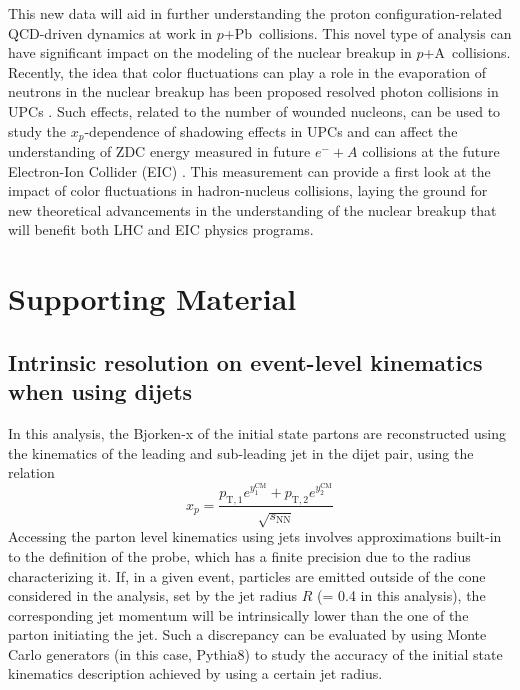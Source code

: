 \documentclass[NOTE, atlasdraft=true, texlive=2020, UKenglish]{atlasdoc}
\newcommand{\xp}{$x_{p}$}
\newcommand{\pxA}{$p$+A}
\newcommand{\pxPb}{$p$+Pb}
\newcommand{\TN}[1]{ \text{#1} }
\newif\ifinternalnote
\begin{document}
This new data will aid in further understanding the proton configuration-related QCD-driven dynamics at work in \pxPb\ collisions. This novel type of analysis can have significant impact on the modeling of the nuclear breakup in \pxA\ collisions. Recently, the idea that color fluctuations can play a role in the evaporation of neutrons in the nuclear breakup has been proposed resolved photon collisions in UPCs \cite{Alvioli:2024cmd}. Such effects, related to the number of wounded nucleons, can be used to study the \xp-dependence of shadowing effects in UPCs and can affect the understanding of ZDC energy measured in future $e^-+A$ collisions at the future Electron-Ion Collider (EIC) \cite{Zheng:2014cha}. This measurement can provide a first look at the impact of color fluctuations in hadron-nucleus collisions, laying the ground for new theoretical advancements in the understanding of the nuclear breakup that will benefit both LHC and EIC physics programs. 
\clearpage{}

\printbibliography


\clearpage



\clearpage{}\section{Supporting Material} 


\ifinternalnote
\else \fi 





\subsection{Intrinsic resolution on event-level kinematics when using dijets}
\label{sec:xp_res}
In this analysis, the Bjorken-x of the initial state partons are reconstructed using the kinematics of the leading and sub-leading jet in the dijet pair, using the relation 
\begin{equation}
x_p = 
\frac{ p_{\TN{T},1}e^{y^\TN{CM}_{1}} 
+ 
p_{\TN{T},2}e^{y^\TN{CM}_{2}}}
{\sqrt{s_\mathrm{NN}}}
\label{eq:xp_aux}
\end{equation}
Accessing the parton level kinematics using jets involves approximations built-in to the definition of the probe, which has a finite precision due to the radius characterizing it. If, in a given event, particles are emitted outside of the cone considered in the analysis, set by the jet radius $R$ (= 0.4 in this analysis), the corresponding jet momentum will be intrinsically lower than the one of the parton initiating the jet. Such a discrepancy can be evaluated by using Monte Carlo generators (in this case, Pythia8) to study the accuracy of the initial state kinematics description achieved by using a certain jet radius. 
\end{document}
